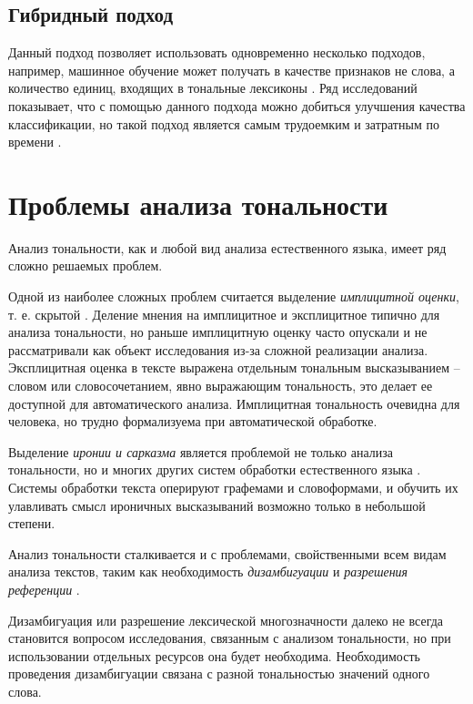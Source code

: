 \documentclass[a4paper,14pt, unknownkeysallowed]{extreport}
\begin{document}
	\subsection{Гибридный подход}
	
	Данный подход позволяет использовать одновременно несколько подходов, например, машинное обучение может получать в качестве признаков не слова, а количество единиц, входящих в тональные лексиконы \cite{Poletaeva}. Ряд исследований показывает, что с помощью данного подхода можно добиться улучшения качества классификации, но такой подход является самым трудоемким и затратным по времени \cite{Samigulin}.


\section{Проблемы анализа тональности}

Анализ тональности, как и любой вид анализа естественного языка, имеет ряд сложно решаемых проблем.

Одной из наиболее сложных проблем считается выделение \textit{имплицитной оценки}, т. е. скрытой \cite{Semina2}. Деление мнения на имплицитное и эксплицитное типично для анализа тональности, но раньше имплицитную оценку часто опускали и не рассматривали как объект исследования из-за сложной реализации анализа. Эксплицитная оценка в тексте выражена отдельным тональным высказыванием -- словом или словосочетанием, явно выражающим тональность, это делает ее доступной для автоматического анализа. Имплицитная тональность очевидна для человека, но трудно формализуема при автоматической обработке. 

Выделение \textit{иронии и сарказма} является проблемой не только анализа тональности, но и многих других систем обработки естественного языка \cite{Semina2}. Системы обработки текста оперируют графемами и словоформами, и обучить их улавливать смысл ироничных высказываний возможно только в небольшой степени.

Анализ тональности сталкивается и с проблемами, свойственными всем видам анализа текстов, таким как необходимость
\textit{дизамбигуации} и \textit{разрешения референции} \cite{Semina2}.

Дизамбигуация или разрешение лексической многозначности далеко не всегда становится вопросом исследования, связанным с анализом тональности, но при использовании отдельных ресурсов она будет необходима. Необходимость проведения дизамбигуации связана с разной тональностью значений одного слова.
\end{document}
